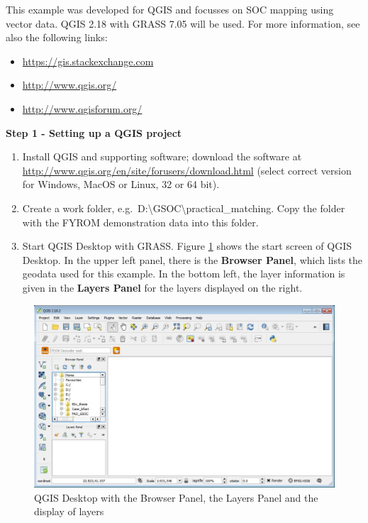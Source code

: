 \documentclass[10pt,b5paper,]{book}
\providecommand{\tightlist}{%
  \setlength{\itemsep}{0pt}\setlength{\parskip}{0pt}}
\theoremstyle{definition}
\theoremstyle{definition}
\theoremstyle{definition}
\theoremstyle{remark}
\begin{document}
This example was developed for QGIS and focusses on SOC mapping using
vector data. QGIS 2.18 with GRASS 7.05 will be used. For more
information, see also the following links:

\begin{itemize}
\tightlist
\item
  \url{https://gis.stackexchange.com}
\item
  \url{http://www.qgis.org/}
\item
  \url{http://www.qgisforum.org/}
\end{itemize}

\textbf{Step 1 - Setting up a QGIS project}

\begin{enumerate}
\def\labelenumi{\arabic{enumi}.}
\tightlist
\item
  Install QGIS and supporting software; download the software at
  \url{http://www.qgis.org/en/site/forusers/download.html} (select
  correct version for Windows, MacOS or Linux, 32 or 64 bit).
\item
  Create a work folder,
  e.g.~D:\textbackslash{}GSOC\textbackslash{}practical\_matching. Copy
  the folder with the FYROM demonstration data into this folder.
\item
  Start QGIS Desktop with GRASS. Figure \ref{fig:qgis} shows the start
  screen of QGIS Desktop. In the upper left panel, there is the
  \textbf{Browser Panel}, which lists the geodata used for this example.
  In the bottom left, the layer information is given in the
  \textbf{Layers Panel} for the layers displayed on the right.
\end{enumerate}

\begin{figure}

{\centering \includegraphics[width=0.8\linewidth]{images/Conv_upscaling1} 

}

\caption{QGIS Desktop with the Browser Panel, the Layers Panel and the display of layers}\label{fig:qgis}
\end{figure}
\end{document}
